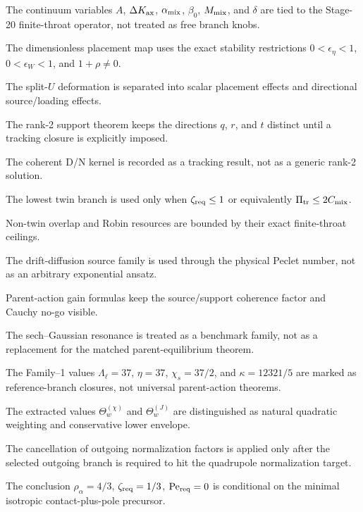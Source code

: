 \begin{verificationchecklist}
\item The continuum variables \(A\), \(\Delta K_{\rm ax}\), \(\alpha_{\rm mix}\), \(\beta_0\), \(M_{\rm mix}\), and \(\delta\) are tied to the Stage-20 finite-throat operator, not treated as free branch knobs.
\item The dimensionless placement map uses the exact stability restrictions \(0<\epsilon_\eta<1\), \(0<\epsilon_W<1\), and \(1+\rho\neq0\).
\item The split-\(U\) deformation is separated into scalar placement effects and directional source/loading effects.
\item The rank-2 support theorem keeps the directions \(q\), \(r\), and \(t\) distinct until a tracking closure is explicitly imposed.
\item The coherent D/N kernel is recorded as a tracking result, not as a generic rank-2 solution.
\item The lowest twin branch is used only when \(\zeta_{\rm req}\leq1\) or equivalently \(\Pi_{\rm tr}\leq2C_{\rm mix}\).
\item Non-twin overlap and Robin resources are bounded by their exact finite-throat ceilings.
\item The drift-diffusion source family is used through the physical Peclet number, not as an arbitrary exponential ansatz.
\item Parent-action gain formulas keep the source/support coherence factor and Cauchy no-go visible.
\item The sech--Gaussian resonance is treated as a benchmark family, not as a replacement for the matched parent-equilibrium theorem.
\item The Family--1 values \(\Lambda_\ell=37\), \(\eta=37\), \(\chi_s=37/2\), and \(\kappa=12321/5\) are marked as reference-branch closures, not universal parent-action theorems.
\item The extracted values \(\Theta_w^{(\chi)}\) and \(\Theta_w^{(J)}\) are distinguished as natural quadratic weighting and conservative lower envelope.
\item The cancellation of outgoing normalization factors is applied only after the selected outgoing branch is required to hit the quadrupole normalization target.
\item The conclusion \(\rho_\alpha=4/3\), \(\zeta_{\rm req}=1/3\), \(\mathrm{Pe}_{\rm req}=0\) is conditional on the minimal isotropic contact-plus-pole precursor.
\end{verificationchecklist}

